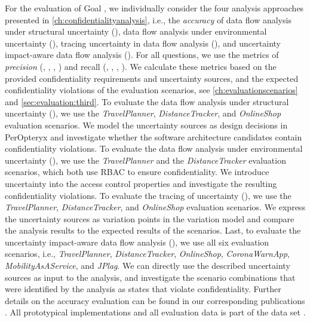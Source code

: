For the evaluation of Goal , we individually consider the four analysis approaches presented in \autoref{ch:confidentialityanalysis}, i.e., the \emph{accuracy} of data flow analysis under structural uncertainty (), data flow analysis under environmental uncertainty (), tracing uncertainty in data flow analysis (), and uncertainty impact-aware data flow analysis ().
For all questions, we use the metrics of \emph{precision} (, , , ) and recall (, , , ).
We calculate these metrics based on the provided confidentiality requirements and uncertainty sources, and the expected confidentiality violations of the evaluation scenarios, see \autoref{ch:evaluationscenarios} and \autoref{sec:evaluation:third}.
To evaluate the data flow analysis under structural uncertainty (), we use the \emph{TravelPlanner}, \emph{DistanceTracker}, and \emph{OnlineShop} evaluation scenarios.
We model the uncertainty sources as design decisions in PerOpteryx \cite{koziolek_automated_2011,koziolek_peropteryx_2011} and investigate whether the software architecture candidates contain confidentiality violations.
To evaluate the data flow analysis under environmental uncertainty (), we use the \emph{TravelPlanner} and the \emph{DistanceTracker} evaluation scenarios, which both use \acf{RBAC} to ensure confidentiality.
We introduce uncertainty into the access control properties and investigate the resulting confidentiality violations.
To evaluate the tracing of uncertainty (), we use the \emph{TravelPlanner}, \emph{DistanceTracker}, and \emph{OnlineShop} evaluation scenarios.
We express the uncertainty sources as variation points in the variation model and compare the analysis results to the expected results of the scenarios.
Last, to evaluate the uncertainty impact-aware data flow analysis (), we use all six evaluation scenarios, i.e., \emph{TravelPlanner}, \emph{DistanceTracker}, \emph{OnlineShop}, \emph{CoronaWarnApp}, \emph{MobilityAsAService}, and \emph{JPlag}.
We can directly use the described uncertainty sources as input to the analysis, and investigate the scenario combinations that were identified by the analysis as states that violate confidentiality.
Further details on the accuracy evaluation can be found in our corresponding publications \cite{walter_architectural_2022,boltz_architectural_2021,hahner_model-based_2023}.
All prototypical implementations and all evaluation data is part of the data set \cite{dataset}.


